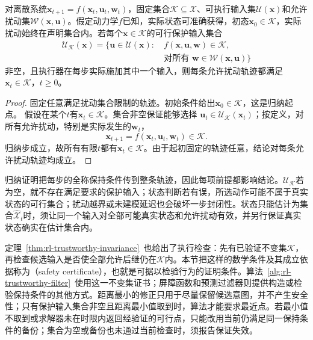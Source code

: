 \begin{theorem}[安全集的一步封闭性保证]
  \label{thm:rl-trustworthy-invariance}
  对离散系统$\bm{x}_{t+1}=f(\bm{x}_t,\bm{u}_t,\bm{w}_t)$，固定集合$\mathcal K\subseteq\mathcal X$、可执行输入集$\mathcal U(\bm{x})$和允许扰动集$\mathcal W(\bm{x},\bm{u})$。假定动力学$f$已知，实际状态可准确获得，初态$\bm{x}_0\in\mathcal K$，实际扰动始终在声明集合内。若每个$\bm{x}\in\mathcal K$的可行保护输入集合
  \[
    \begin{aligned}
      \mathcal U_{\mathcal K}(\bm{x})
        =\bigl\{\bm{u}\in\mathcal U(\bm{x}):\ &
          f(\bm{x},\bm{u},\bm{w})\in\mathcal K,\\
        &\text{对所有 }\bm{w}\in\mathcal W(\bm{x},\bm{u})\bigr\}
    \end{aligned}
  \]
  非空，且执行器在每步实际施加其中一个输入，则每条允许扰动轨迹都满足$\bm{x}_t\in\mathcal K$，$t\geq0$。
\end{theorem}
\begin{proof}
  固定任意满足扰动集合限制的轨迹。初始条件给出$\bm{x}_0\in\mathcal K$，这是归纳起点。
  假设在某个$t$有$\bm{x}_t\in\mathcal K$。集合非空保证能够选择
  $\bm{u}_t\in\mathcal U_{\mathcal K}(\bm{x}_t)$；按定义，对所有允许扰动，特别是实际发生的$\bm{w}_t$，
  \[
    \bm{x}_{t+1}=f(\bm{x}_t,\bm{u}_t,\bm{w}_t)\in\mathcal K.
  \]
  归纳步成立，故所有有限$t$都有$\bm{x}_t\in\mathcal K$。由于起初固定的轨迹任意，结论对每条允许扰动轨迹均成立。
\end{proof}

归纳证明把每步的全称保持条件传到整条轨迹，因此每项前提都影响结论。$\mathcal U_{\mathcal K}$若为空，就不存在满足要求的保护输入；状态判断若有误，所选动作可能不属于真实状态的可行集合；扰动越界或未建模延迟也会破坏一步封闭性。状态只能估计为集合$\widehat{\mathcal X}_t$时，须让同一个输入对全部可能真实状态和允许扰动有效，并另行保证真实状态确实在估计集合内。

定理~\ref{thm:rl-trustworthy-invariance}~也给出了执行检查：先有已验证不变集$\mathcal K$，再检查候选输入是否使全部允许后继仍在$\mathcal K$内。本节把这样的数学条件及其成立依据称为（safety certificate），也就是可据以检验行为的证明条件。算法~\ref{alg:rl-trustworthy-filter}~使用这一不变集证书；屏障函数和预测过滤器则提供构造或检验保持条件的其他方式。距离最小的修正只用于尽量保留候选意图，并不产生安全性；只有保护输入集合非空且距离最小值取到时，算法才能要求最近点。若最小值不取到或求解器未在时限内返回经验证的可行点，只能改用当前仍满足同一保持条件的备份；集合为空或备份也未通过当前检查时，须报告保证失效。

